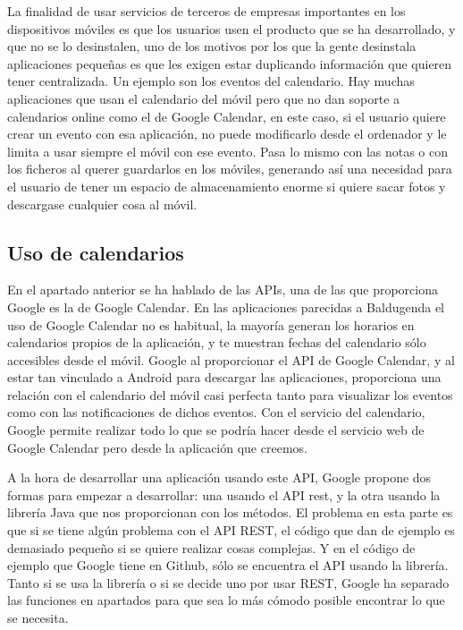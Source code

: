 La finalidad de usar servicios de terceros de empresas importantes en los dispositivos móviles es que los usuarios usen el producto que se ha desarrollado, y que no se lo desinstalen, uno de los motivos por los que la gente desinstala aplicaciones pequeñas es que les exigen estar duplicando información que quieren tener centralizada. Un ejemplo son los eventos del calendario. Hay muchas aplicaciones que usan el calendario del móvil pero que no dan soporte a calendarios online como el de Google Calendar, en este caso, si el usuario quiere crear un evento con esa aplicación, no puede modificarlo desde el ordenador y le limita a usar siempre el móvil con ese evento.
Pasa lo mismo con las notas o con los ficheros al querer guardarlos en los móviles, generando así una necesidad para el usuario de tener un espacio de almacenamiento enorme si quiere sacar fotos y descargase cualquier cosa al móvil.

\subsection{Uso de calendarios}
\label{subsecc:Uso de calendarios}

En el apartado anterior se ha hablado de las APIs,  una de las que proporciona Google es la de Google Calendar. En las aplicaciones parecidas a Baldugenda el uso de Google Calendar no es habitual, la mayoría generan los horarios en calendarios propios de la aplicación, y te muestran fechas del calendario sólo accesibles desde el móvil.
Google al proporcionar el API de Google Calendar, y al estar tan vinculado a Android para descargar las aplicaciones, proporciona una relación con el calendario del móvil casi perfecta tanto para visualizar los eventos como con las notificaciones de dichos eventos.
Con el servicio del calendario, Google permite realizar todo lo que se podría hacer desde el servicio web de Google Calendar pero desde la aplicación que creemos.

A la hora de desarrollar una aplicación usando este API, Google propone dos formas para empezar a desarrollar: una usando el API \acrshort{rest}, y la otra usando la librería Java que nos proporcionan con los métodos.
El problema en esta parte es que si se tiene algún problema con el API REST, el código que dan de ejemplo es demasiado pequeño si se quiere realizar cosas complejas. Y en el código de ejemplo que Google tiene en \gls{Github}, sólo se encuentra el API usando la librería.
Tanto si se usa la librería o si se decide uno por usar REST, Google ha separado las funciones en apartados para que sea lo más cómodo posible encontrar lo que se necesita.

